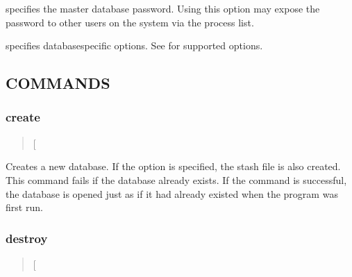 \documentclass[letterpaper,10pt,english]{sphinxmanual}
\begin{document}
\begin{description}
\sphinxAtStartPar
specifies the master database password.  Using this option may
expose the password to other users on the system via the process
list.

\sphinxAtStartPar
specifies database\sphinxhyphen{}specific options.  See {\hyperref[\detokenize{admin/admin_commands/kadmin_local:kadmin-1}]{}} for
supported options.

\end{description}


\subsection{COMMANDS}
\label{\detokenize{admin/admin_commands/kdb5_util:commands}}\label{\detokenize{admin/admin_commands/kdb5_util:kdb5-util-options-end}}

\subsubsection{create}
\label{\detokenize{admin/admin_commands/kdb5_util:create}}\label{\detokenize{admin/admin_commands/kdb5_util:kdb5-util-create}}\begin{quote}

\sphinxAtStartPar
{} {[}\sphinxstylestrong{\sphinxhyphen{}s}{]}
\end{quote}

\sphinxAtStartPar
Creates a new database.  If the  option is specified, the stash
file is also created.  This command fails if the database already
exists.  If the command is successful, the database is opened just as
if it had already existed when the program was first run.


\subsubsection{destroy}
\label{\detokenize{admin/admin_commands/kdb5_util:destroy}}\label{\detokenize{admin/admin_commands/kdb5_util:kdb5-util-create-end}}\label{\detokenize{admin/admin_commands/kdb5_util:kdb5-util-destroy}}\begin{quote}

\sphinxAtStartPar
{} {[}\sphinxstylestrong{\sphinxhyphen{}f}{]}
\end{quote}
\end{document}
